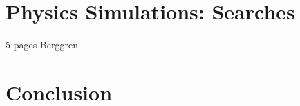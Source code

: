 \documentclass[%
 reprint,
nofootinbib,
 amsmath,amssymb,
 aps,
]{revtex4-1}
\begin{document}
  



\section{\label{sec:searches}Physics Simulations: Searches }


  5 pages Berggren
  
 

\section{\label{sec:conclusion}Conclusion}




%

\end{document}
